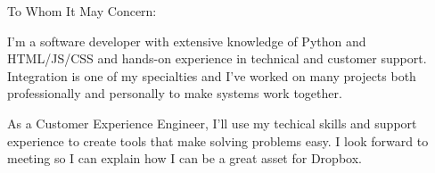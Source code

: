 
\opening{To Whom It May Concern:} 
I'm a software developer with extensive knowledge of Python and HTML/JS/CSS and hands-on experience in technical and customer support. Integration is one of my specialties and I've worked on many projects both professionally and personally to make systems work together. 

    As a Customer Experience Engineer, I'll use my techical skills and support experience to create tools that make solving problems easy. I look forward to meeting so I can explain how I can be a great asset for Dropbox. 
